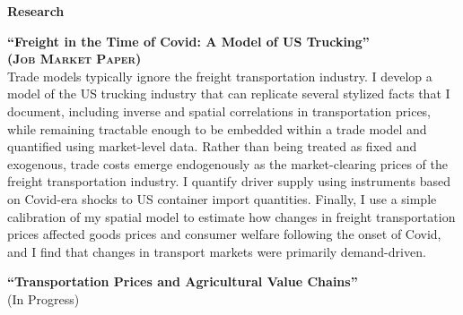 \documentclass[10pt, oneside]{article}
\makeatletter
\newlength\tdima
\newcommand\tabfill[1]{%
      \setlength\tdima{\linewidth}%
      \addtolength\tdima{\@totalleftmargin}%
      \addtolength\tdima{-\dimen\@curtab}%
      \parbox[t]{\tdima}{#1\ifhmode\strut\fi}}
\newcommand\mytabs{\hspace*{1cm}\=\hspace{1cm}\=\hspace{1cm}\=\hspace{1cm}\=\hspace{1cm}\=\hspace{1cm}\=\hspace{1cm}\=\hspace{1cm}\=\hspace{1cm}\=\hspace{1cm}}
\newenvironment{mysec}[1][\mytabs]
  {\begin{tabbing}#1\kill\ignorespaces}
  {\end{tabbing}}
\makeatother
\begin{document}


\begin{minipage}[t]{0.1\linewidth}
\textbf{Research}
\end{minipage}\hspace{0.05\linewidth}
\begin{minipage}[t]{0.8\linewidth}
\textbf{``Freight in the Time of Covid: A Model of US Trucking''\\ 
(\textsc{Job Market Paper})}\\ 

Trade models typically ignore the freight transportation industry. I develop a model of the US trucking industry that can replicate several stylized facts that I document, including inverse and spatial correlations in transportation prices, while remaining tractable enough to be embedded within a trade model and quantified using market-level data. Rather than being treated as fixed and exogenous, trade costs emerge endogenously as the market-clearing prices of the freight transportation industry. I quantify driver supply using instruments based on Covid-era shocks to US container import quantities. Finally, I use a simple calibration of my spatial model to estimate how changes in freight transportation prices affected goods prices and consumer welfare following the onset of Covid, and I find that changes in transport markets were primarily demand-driven.


\vspace{5mm}

\textbf{``Transportation Prices and Agricultural Value Chains''}\\
(In Progress)

\end{minipage}\vspace{5mm}
\end{document}
